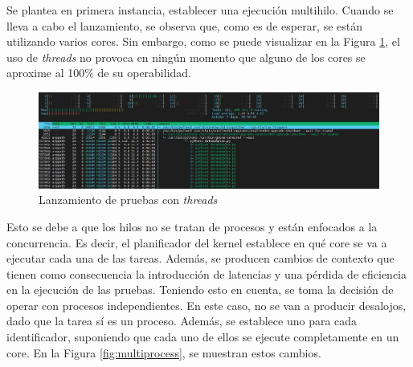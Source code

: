   


Se plantea en primera instancia, establecer una ejecución multihilo. Cuando se lleva a cabo el lanzamiento, se observa que, como es de esperar, se están utilizando varios cores. Sin embargo, como se puede visualizar en la Figura \ref{fig:multihilo}, el uso de \textit{threads} no provoca en ningún momento que alguno de los cores se aproxime al 100\% de su operabilidad.

\vspace{3mm}

\begin{figure}[h!]
  \centering
  \includegraphics[width=1\textwidth]{img/diseno/multihilo.jpg}
  \caption{Lanzamiento de pruebas con \textit{threads}}
  \label{fig:multihilo}
\end{figure}

\vspace{3mm}

Esto se debe a que los hilos no se tratan de procesos y están enfocados a la concurrencia. Es decir, el planificador del kernel establece en qué core se va a ejecutar cada una de las tareas. Además, se producen cambios de contexto que tienen como consecuencia la introducción de latencias y una pérdida de eficiencia en la ejecución de las pruebas. Teniendo esto en cuenta, se toma la decisión de operar con procesos independientes. En este caso, no se van a producir desalojos, dado que la tarea sí es un proceso. Además, se establece uno para cada identificador, suponiendo que cada uno de ellos se ejecute completamente en un core. En la Figura \ref{fig:multiprocess}, se muestran estos cambios. \cite{thread}

\vspace{3mm}

